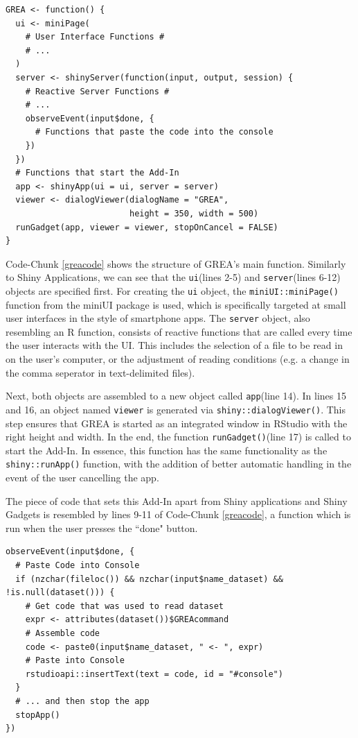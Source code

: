 \documentclass[12pt]{article} %
\newcommand{\li}{\lstinline}
\begin{document}
\begin{lstlisting}[caption = Structure of the \li{GREA()} function, label = greacode]
GREA <- function() {
  ui <- miniPage(
    # User Interface Functions #
    # ...
  )
  server <- shinyServer(function(input, output, session) {
    # Reactive Server Functions #
    # ...
    observeEvent(input$done, {
      # Functions that paste the code into the console
    })
  })
  # Functions that start the Add-In
  app <- shinyApp(ui = ui, server = server)
  viewer <- dialogViewer(dialogName = "GREA", 
                         height = 350, width = 500)
  runGadget(app, viewer = viewer, stopOnCancel = FALSE)
}
\end{lstlisting}

Code-Chunk \ref{greacode} shows the structure of GREA's main function. Similarly to Shiny Applications, we can see that the \li{ui}(lines 2-5) and \li{server}(lines 6-12) objects are specified first. For creating the \li{ui} object, the \li{miniUI::miniPage()} function from the miniUI package \cite[Cheng 2016]{w4} is used, which is specifically targeted at small user interfaces in the style of smartphone apps. The \li{server} object, also resembling an R function, consists of reactive functions that are called every time the user interacts with the UI. This includes the selection of a file to be read in on the user's computer, or the adjustment of reading conditions (e.g. a change in the comma seperator in text-delimited files).

Next, both objects are assembled to a new object called \li{app}(line 14). In lines 15 and 16, an object named \li{viewer} is generated via \li{shiny::dialogViewer()}. This step ensures that GREA is started as an integrated window in RStudio with the right height and width. In the end, the function \li{runGadget()}(line 17) is called to start the Add-In. In essence, this function has the same functionality as the \li{shiny::runApp()} function, with the addition of better automatic handling in the event of the user cancelling the app.

The piece of code that sets this Add-In apart from Shiny applications and Shiny Gadgets is resembled by lines 9-11 of Code-Chunk \ref{greacode}, a function which is run when the user presses the ``done" button.

\begin{lstlisting}[caption = Contents of reactive function for ``Done"-event, label = doneeventcode]
observeEvent(input$done, {
  # Paste Code into Console
  if (nzchar(fileloc()) && nzchar(input$name_dataset) && !is.null(dataset())) {
    # Get code that was used to read dataset
    expr <- attributes(dataset())$GREAcommand
    # Assemble code
    code <- paste0(input$name_dataset, " <- ", expr)
    # Paste into Console
    rstudioapi::insertText(text = code, id = "#console")
  }
  # ... and then stop the app
  stopApp()
})
\end{lstlisting}
\end{document}
